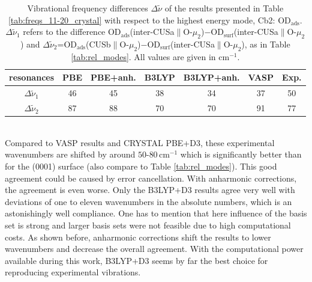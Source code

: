 \documentclass[11pt,DIV=13,BCOR=5mm,a4paper,headinclude]{scrbook}
\begin{document}
\begin{table}[!h]
  \centering
  \caption{Vibrational frequency differences $\Delta \tilde{\nu}$ of the results presented in Table \ref{tab:freqs_11-20_crystal} with respect to the highest energy mode, Cb2: OD$_\textrm{ads}$.
  $\Delta \tilde{\nu}_1$ refers to the difference OD$_\textrm{ads}$(inter-CUSa$\parallel$O-$\mu_2$)$-$OD$_\textrm{surf}$(inter-CUSa$\parallel$O-$\mu_2$) and $\Delta \tilde{\nu}_2$=OD$_\textrm{ads}$(CUSb$\parallel$O-$\mu_2$)$-$OD$_\textrm{surf}$(inter-CUSa$\parallel$O-$\mu_2$), as in Table \ref{tab:rel_modes}.
All values are given in cm$^{-1}$.}
  \begin{tabular}{c|cc|cc|c|c}
  \toprule
   resonances& PBE & PBE+anh. & B3LYP & B3LYP+anh. &VASP&Exp.\\\midrule
$\Delta \tilde{\nu}_1$ & 46 & 45 & 38 & 34 & 37 & 50\\
$\Delta \tilde{\nu}_2$  & 87 & 88 & 70 & 70 & 91 & 77\\\bottomrule
    \end{tabular}
  \label{tab:freqs_11-20_crystal-relative}
\end{table}
\\

Compared to VASP results and CRYSTAL PBE+D3, these experimental wavenumbers are shifted by around $50$-$80\,$cm$^{-1}$ which is significantly better than for the (0001) surface (also compare to Table \ref{tab:rel_modes}).
This good agreement could be caused by error cancellation.
With anharmonic corrections, the agreement is even worse.
Only the B3LYP+D3 results agree very well with deviations of one to eleven wavenumbers in the absolute numbers, which is an astonishingly well compliance.
One has to mention that here influence of the basis set is strong and larger basis sets were not feasible due to high computational costs.
As shown before, anharmonic corrections shift the results to lower wavenumbers and decrease the overall agreement.
With the computational power available during this work, B3LYP+D3 seems by far the best choice for reproducing experimental vibrations.
\end{document}
